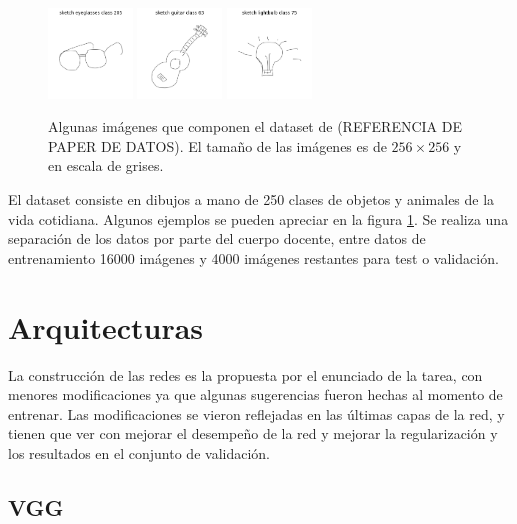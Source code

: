     \begin{figure}[t]
        \centering
        \includegraphics[width=0.2\textwidth]{img/glasses.png}
        \includegraphics[width=0.2\textwidth]{img/guitar.png}
        \includegraphics[width=0.2\textwidth]{img/bulb.png}
        \caption{Algunas imágenes que componen el dataset de (REFERENCIA DE PAPER DE DATOS). El tamaño de las imágenes es de $256 \times 256$ y en escala de grises.}
        \label{fig:dataset}
    \end{figure}
    
    El dataset consiste en dibujos a mano de 250 clases de objetos y animales de la vida cotidiana. Algunos ejemplos se pueden apreciar en la figura \ref{fig:dataset}. Se realiza una separación de los datos por parte del cuerpo docente, entre datos de entrenamiento 16000 imágenes y 4000 imágenes restantes para test o validación.
    
\section{Arquitecturas}
    
    La construcción de las redes es la propuesta por el enunciado de la tarea, con menores modificaciones ya que algunas sugerencias fueron hechas al momento de entrenar. Las modificaciones se vieron reflejadas en las últimas capas de la red, y tienen que ver con mejorar el desempeño de la red y mejorar la regularización y los resultados en el conjunto de validación.
    
    
    \subsection{VGG}
        
